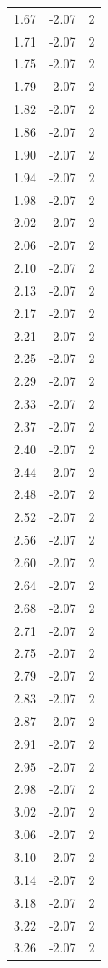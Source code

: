 \begin{longtable}{lrr}
  1.67 & -2.07 & 2 \\
  1.71 & -2.07 & 2 \\
  1.75 & -2.07 & 2 \\
  1.79 & -2.07 & 2 \\
  1.82 & -2.07 & 2 \\
  1.86 & -2.07 & 2 \\
  1.90 & -2.07 & 2 \\
  1.94 & -2.07 & 2 \\
  1.98 & -2.07 & 2 \\
  2.02 & -2.07 & 2 \\
  2.06 & -2.07 & 2 \\
  2.10 & -2.07 & 2 \\
  2.13 & -2.07 & 2 \\
  2.17 & -2.07 & 2 \\
  2.21 & -2.07 & 2 \\
  2.25 & -2.07 & 2 \\
  2.29 & -2.07 & 2 \\
  2.33 & -2.07 & 2 \\
  2.37 & -2.07 & 2 \\
  2.40 & -2.07 & 2 \\
  2.44 & -2.07 & 2 \\
  2.48 & -2.07 & 2 \\
  2.52 & -2.07 & 2 \\
  2.56 & -2.07 & 2 \\
  2.60 & -2.07 & 2 \\
  2.64 & -2.07 & 2 \\
  2.68 & -2.07 & 2 \\
  2.71 & -2.07 & 2 \\
  2.75 & -2.07 & 2 \\
  2.79 & -2.07 & 2 \\
  2.83 & -2.07 & 2 \\
  2.87 & -2.07 & 2 \\
  2.91 & -2.07 & 2 \\
  2.95 & -2.07 & 2 \\
  2.98 & -2.07 & 2 \\
  3.02 & -2.07 & 2 \\
  3.06 & -2.07 & 2 \\
  3.10 & -2.07 & 2 \\
  3.14 & -2.07 & 2 \\
  3.18 & -2.07 & 2 \\
  3.22 & -2.07 & 2 \\
  3.26 & -2.07 & 2 \\

\end{longtable}
